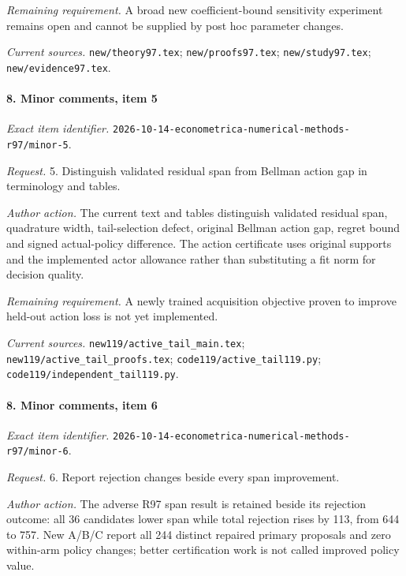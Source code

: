 \par\emph{Remaining requirement.} A broad new coefficient-bound sensitivity experiment remains open and cannot be supplied by post hoc parameter changes.

\par\emph{Current sources.} \nolinkurl{new/theory97.tex}; \nolinkurl{new/proofs97.tex}; \nolinkurl{new/study97.tex}; \nolinkurl{new/evidence97.tex}.

\paragraph{8. Minor comments, item 5}

\emph{Exact item identifier.} \nolinkurl{2026-10-14-econometrica-numerical-methods-r97/minor-5}.

\par\emph{Request.} 5. Distinguish validated residual span from Bellman action gap in terminology and tables.

\par\emph{Author action.} The current text and tables distinguish validated residual span, quadrature width, tail-selection defect, original Bellman action gap, regret bound and signed actual-policy difference. The action certificate uses original supports and the implemented actor allowance rather than substituting a fit norm for decision quality.

\par\emph{Remaining requirement.} A newly trained acquisition objective proven to improve held-out action loss is not yet implemented.

\par\emph{Current sources.} \nolinkurl{new119/active_tail_main.tex}; \nolinkurl{new119/active_tail_proofs.tex}; \nolinkurl{code119/active_tail119.py}; \nolinkurl{code119/independent_tail119.py}.

\paragraph{8. Minor comments, item 6}

\emph{Exact item identifier.} \nolinkurl{2026-10-14-econometrica-numerical-methods-r97/minor-6}.

\par\emph{Request.} 6. Report rejection changes beside every span improvement.

\par\emph{Author action.} The adverse R97 span result is retained beside its rejection outcome: all 36 candidates lower span while total rejection rises by 113, from 644 to 757. New A/\allowbreak{}B/\allowbreak{}C report all 244 distinct repaired primary proposals and zero within-arm policy changes; better certification work is not called improved policy value.

